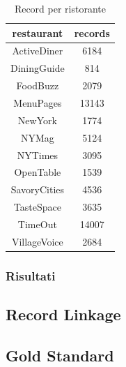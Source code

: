 \documentclass[a4paper,12pt]{article}
\begin{document}
\begin{table}[H]\centering
\begin{tabular}{|c|c|}
\hline
\textbf{restaurant} & \textbf{records} \\ \hline
ActiveDiner & 6184 \\ \hline
DiningGuide & 814 \\ \hline
FoodBuzz & 2079 \\ \hline
MenuPages & 13143 \\ \hline
NewYork & 1774 \\ \hline
NYMag & 5124 \\ \hline
NYTimes & 3095 \\ \hline
OpenTable & 1539 \\ \hline
SavoryCities & 4536 \\ \hline
TasteSpace & 3635 \\ \hline
TimeOut & 14007 \\ \hline
VillageVoice & 2684 \\ \hline
\end{tabular}
\caption{Record per ristorante}
\label{tab:my-table}
\end{table}

\subsubsection{Risultati}

\subsection{Record Linkage}

\subsection{Gold Standard}
\end{document}
